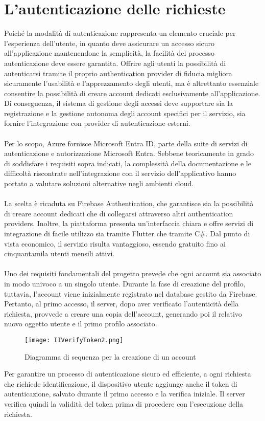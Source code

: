 
\section{L'autenticazione delle richieste}


Poiché la modalità di autenticazione rappresenta un elemento cruciale per l’esperienza dell’utente, 
in quanto deve assicurare un accesso sicuro all’applicazione mantenendone la semplicità, la facilità del processo autenticazione deve essere garantita.
Offrire agli utenti la possibilità di autenticarsi tramite il proprio authentication provider di fiducia migliora sicuramente l’usabilità e l’apprezzamento degli utenti, 
ma è altrettanto essenziale consentire la possibilità di creare account dedicati esclusivamente all’applicazione.
Di conseguenza, il sistema di gestione degli accessi deve supportare sia la registrazione e la gestione autonoma degli account specifici per il servizio, 
sia fornire l'integrazione con provider di autenticazione esterni.\\
\\
Per lo scopo, Azure fornisce Microsoft Entra ID, parte della suite di servizi di autenticazione e autorizzazione Microsoft Entra. 
Sebbene teoricamente in grado di soddisfare i requisiti sopra indicati, 
la complessità della documentazione e le difficoltà riscontrate nell’integrazione con il servizio dell’applicativo
 hanno portato a valutare soluzioni alternative negli ambienti cloud.\\
\\
La scelta è ricaduta su Firebase Authentication, che garantisce sia la possibilità di creare account dedicati che di collegarsi attraverso altri authentication providers. 
Inoltre, la piattaforma presenta un’interfaccia chiara e offre servizi di integrazione di facile utilizzo sia tramite Flutter che tramite C\#.
Dal punto di vista economico, il servizio risulta vantaggioso, essendo gratuito fino ai cinquantamila utenti mensili attivi.\\
\\
Uno dei requisiti fondamentali del progetto prevede che ogni account sia associato in modo univoco a un singolo utente. 
Durante la fase di creazione del profilo, tuttavia, l’account viene inizialmente registrato nel database gestito da Firebase. 
Pertanto, al primo accesso, il server, dopo aver verificato l’autenticità della richiesta, provvede a creare una copia dell’account, 
generando poi il relativo nuovo oggetto utente e il primo profilo associato.\\
\clearpage
\begin{figure}[h!]
    \centering
    \texttt{[image: IIVerifyToken2.png]}
    \caption{Diagramma di sequenza per la creazione di un account}
\end{figure}
Per garantire un processo di autenticazione sicuro ed efficiente, a ogni richiesta che richiede identificazione, 
il dispositivo utente aggiunge anche il token di autenticazione, salvato durante il primo accesso e la verifica iniziale. 
Il server verifica quindi la validità del token prima di procedere con l'esecuzione della richiesta.

